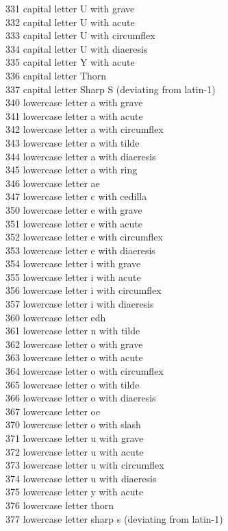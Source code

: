 \documentclass{article}
\renewcommand{\-}{\discretionary{\char'0177 }{}{}}
\begin{document}
\begin{tabbing}
331 \> capital letter U with grave\\
332 \> capital letter U with acute\\
333 \> capital letter U with circumflex\\
334 \> capital letter U with diaeresis\\
335 \> capital letter Y with acute\\
336 \> capital letter Thorn\\
337 \> capital letter Sharp S (deviating from latin-1)\\
340 \> lowercase letter a with grave\\
341 \> lowercase letter a with acute\\
342 \> lowercase letter a with circumflex\\
343 \> lowercase letter a with tilde\\
344 \> lowercase letter a with diaeresis\\
345 \> lowercase letter a with ring\\
346 \> lowercase letter ae\\
347 \> lowercase letter c with cedilla\\
350 \> lowercase letter e with grave\\
351 \> lowercase letter e with acute\\
352 \> lowercase letter e with circumflex\\
353 \> lowercase letter e with diaeresis\\
354 \> lowercase letter i with grave\\
355 \> lowercase letter i with acute\\
356 \> lowercase letter i with circumflex\\
357 \> lowercase letter i with diaeresis\\
360 \> lowercase letter edh\\
361 \> lowercase letter n with tilde\\
362 \> lowercase letter o with grave\\
363 \> lowercase letter o with acute\\
364 \> lowercase letter o with circumflex\\
365 \> lowercase letter o with tilde\\
366 \> lowercase letter o with diaeresis\\
367 \> lowercase letter oe\\
370 \> lowercase letter o with slash\\
371 \> lowercase letter u with grave\\
372 \> lowercase letter u with acute\\
373 \> lowercase letter u with circumflex\\
374 \> lowercase letter u with diaeresis\\
375 \> lowercase letter y with acute\\
376 \> lowercase letter thorn\\
377 \> lowercase letter sharp s (deviating from latin-1)
\end{tabbing}
\end{document}
